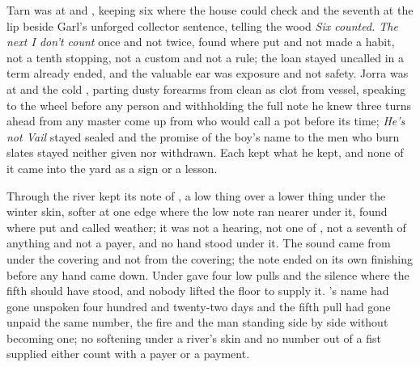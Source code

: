 Tarn was at  and , keeping six where the house could check and the seventh at the lip beside Garl's unforged collector sentence, telling the wood \emph{Six counted. The next I don't count} once and not twice, found where put and not made a habit, not a tenth stopping, not a custom and not a rule; the loan stayed uncalled in a term already ended, and the valuable ear was exposure and not safety. Jorra was at  and the cold , parting dusty forearms from clean as clot from vessel, speaking to the wheel before any person and withholding the full note he knew three turns ahead from any master come up from  who would call a pot before its time; \emph{He's not Vail} stayed sealed and the promise of the boy's name to the men who burn slates stayed neither given nor withdrawn. Each kept what he kept, and none of it came into the yard as a sign or a lesson.

Through  the river kept its note of , a low thing over a lower thing under the winter skin, softer at one edge where the low note ran nearer under it, found where put and called weather; it was not a hearing, not one of , not a seventh of anything and not a payer, and no hand stood under it. The sound came from under the covering and not from the covering; the note ended on its own finishing before any hand came down. Under   gave four low pulls and the silence where the fifth should have stood, and nobody lifted the floor to supply it. 's name had gone unspoken four hundred and twenty-two days and the fifth pull had gone unpaid the same number, the fire and the man standing side by side without becoming one; no softening under a river's skin and no number out of a fist supplied either count with a payer or a payment.

\scenebreak

